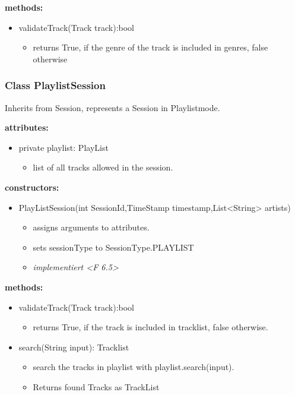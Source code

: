 \documentclass[oneside, ngerman]{sdqtechreport}
\begin{document}
\textbf{methods:}
\begin{itemize}
    \item validateTrack(Track track):bool
    \begin{itemize}
        \item returns True, if the genre of the track is included in genres, false otherwise
    \end{itemize}
\end{itemize}

\subsubsection{Class PlaylistSession}
Inherits from Session, represents a Session in Playlistmode.

\textbf{attributes:}
\begin{itemize}
    \item private playlist: PlayList
    \begin{itemize}
        \item list of all tracks allowed in the session.
    \end{itemize}
\end{itemize}
\textbf{constructors:}
\begin{itemize}
    \item PlayListSession(int SessionId,TimeStamp timestamp,List<String> artists)
    \begin{itemize}
        \item assigns arguments to attributes.
        \item sets sessionType to SessionType.PLAYLIST
        \item \textit{implementiert <F 6.5>}
    \end{itemize}
\end{itemize}

\textbf{methods:}
\begin{itemize}
    \item validateTrack(Track track):bool
    \begin{itemize}
        \item returns True, if the track is included in tracklist, false otherwise.
    \end{itemize}
    \item search(String input): Tracklist
    \begin{itemize}
        \item search the tracks in playlist with playlist.search(input).
        \item Returns found Tracks as TrackList
    \end{itemize}
\end{itemize}
\end{document}
